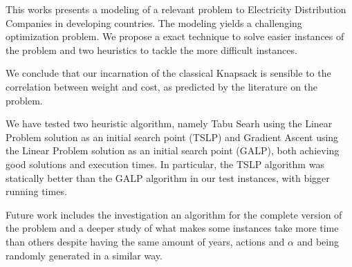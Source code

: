 This works presents a modeling of a relevant problem to Electricity Distribution Companies in developing countries.
The modeling yields a challenging optimization problem. We propose a exact technique to solve easier instances
of the problem and two heuristics to tackle the more difficult instances.

We conclude that our incarnation  of the classical Knapsack is sensible to the correlation between weight and cost, as
predicted by the literature on the problem.

We have tested two heuristic algorithm, namely Tabu Searh using the Linear Problem solution as an initial search point
(TSLP) and Gradient Ascent using the Linear Problem solution as an initial search point (GALP), both achieving good solutions and
execution times. In particular, the TSLP algorithm was statically better than the GALP algorithm
in our test instances, with bigger running times.

Future work includes the investigation an algorithm for the complete version of the problem and
a deeper study of what makes some instances take more time than others despite 
having the same amount of years, actions and $\alpha$ and being randomly generated
in a similar way.

\vspace{1cm}
